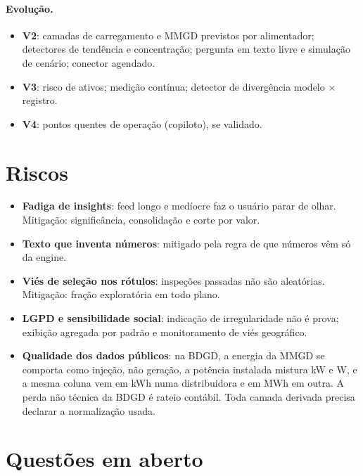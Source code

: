 \documentclass[10pt,a4paper,oneside]{article}
\begin{document}
\paragraph{Evolução.}
\begin{itemize}
  \item \textbf{V2}: camadas de carregamento e MMGD previstos por alimentador;
    detectores de tendência e concentração; pergunta em texto livre e
    simulação de cenário; conector agendado.
  \item \textbf{V3}: risco de ativos; medição contínua; detector de
    divergência modelo × registro.
  \item \textbf{V4}: pontos quentes de operação (copiloto), se validado.
\end{itemize}

\section{Riscos}

\begin{itemize}
  \item \textbf{Fadiga de insights}: feed longo e medíocre faz o usuário
    parar de olhar. Mitigação: significância, consolidação e corte por valor.
  \item \textbf{Texto que inventa números}: mitigado pela regra de que números
    vêm só da engine.
  \item \textbf{Viés de seleção nos rótulos}: inspeções passadas não são
    aleatórias. Mitigação: fração exploratória em todo plano.
  \item \textbf{LGPD e sensibilidade social}: indicação de irregularidade não
    é prova; exibição agregada por padrão e monitoramento de viés geográfico.
  \item \textbf{Qualidade dos dados públicos}: na BDGD, a energia da MMGD
    se comporta como injeção, não geração, a potência instalada mistura kW e
    W, e a mesma coluna vem em kWh numa distribuidora e em MWh em outra. A
    perda não técnica da BDGD é rateio contábil. Toda camada derivada precisa
    declarar a normalização usada.
\end{itemize}

\section{Questões em aberto}
\label{sec:abertas}
\end{document}

